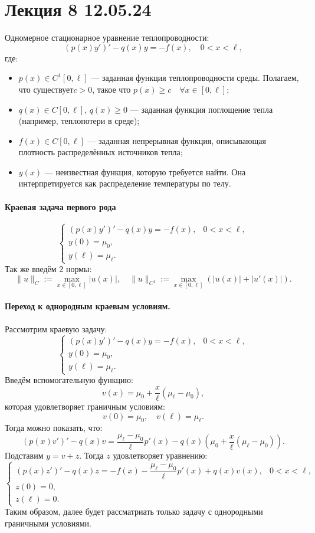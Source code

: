 \section{Лекция 8 12.05.24}

Одномерное стационарное уравнение теплопроводности:
\[
(p(x)y')' - q(x)y = -f(x), \quad 0 < x < \ell,
\]
где:
\begin{itemize}
  \item \( p(x) \in C^1[0,\ell] \) — заданная функция теплопроводности среды. Полагаем, что существует\( c > 0 \), такое что \( p(x) \ge c \quad \forall x \in [0,\ell] \);

  \item \( q(x) \in C[0,\ell] \), \( q(x) \ge 0 \) — заданная функция поглощение тепла (например, теплопотери в среде);

  \item \( f(x) \in C[0,\ell] \) — заданная непрерывная функция, описывающая плотность распределённых источников тепла;

  \item \( y(x) \) — неизвестная функция, которую требуется найти. Она интерпретируется как распределение температуры по телу.
\end{itemize}


\paragraph{Краевая задача первого рода}
\[
\begin{cases}
(p(x)y')' - q(x)y = -f(x), & 0 < x < \ell, \\
y(0) = \mu_0, \\
y(\ell) = \mu_\ell.
\end{cases}
\]
Так же введём 2 нормы:
\[
\|u\|_C := \max_{x \in [0,\ell]} |u(x)|, \quad \|u\|_{C^1} := \max_{x \in [0,\ell]} \left( |u(x)| + |u'(x)| \right).
\]

\paragraph{Переход к однородным краевым условиям.} Рассмотрим краевую задачу:
\[
\begin{cases}
(p(x) y')' - q(x) y = -f(x), & 0 < x < \ell, \\
y(0) = \mu_0, \\
y(\ell) = \mu_\ell.
\end{cases}
\]
Введём вспомогательную функцию:
\[
v(x) = \mu_0 + \frac{x}{\ell}(\mu_\ell - \mu_0),
\]
которая удовлетворяет граничным условиям:
\[
v(0) = \mu_0, \quad v(\ell) = \mu_\ell.
\]
Тогда можно показать, что:
\[
(p(x) v')' - q(x) v = \frac{\mu_\ell - \mu_0}{\ell} p'(x) - q(x)\left(\mu_0 + \frac{x}{\ell}(\mu_\ell - \mu_0)\right).
\]
Подставим \( y = v + z \). Тогда $z$ удовлетворяет уравнению:
\[
\begin{cases}
(p(x) z')' - q(x) z = -f(x) - \dfrac{\mu_\ell - \mu_0}{\ell} p'(x) + q(x) v(x), & 0 < x < \ell, \\
z(0) = 0, \\
z(\ell) = 0.
\end{cases}
\]
Таким образом, далее будет рассматриать только задачу с однородными граничными условиями.


